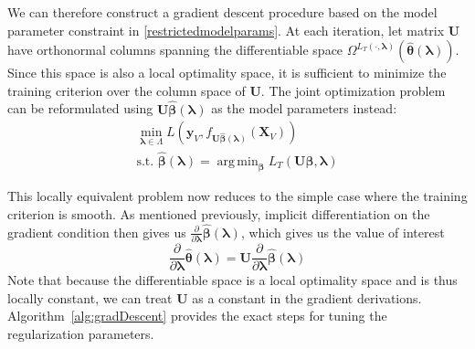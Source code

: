 \documentclass{statsoc}
\DeclareMathOperator*{\argmin}{arg\,min}
\begin{document}
We can therefore construct a gradient descent procedure based on the model parameter constraint in \eqref{restrictedmodelparams}. At each iteration, let matrix $\boldsymbol U$ have orthonormal columns spanning the differentiable space $\Omega^{L_T(\cdot, \boldsymbol{\lambda})}(\hat {\boldsymbol \theta}(\boldsymbol{\lambda}))$. Since this space is also a local optimality space, it is sufficient to minimize the training criterion over the column space of $\boldsymbol U$. The joint optimization problem can be reformulated using $\boldsymbol U \hat {\boldsymbol \beta}(\boldsymbol{\lambda})$ as the model parameters instead:
\begin{equation}
\begin{array}{c}
\min_{\boldsymbol \lambda \in \Lambda} L(\boldsymbol y_V, f_{\boldsymbol U \hat{\boldsymbol \beta} (\boldsymbol \lambda) }(\boldsymbol X_V)) \\
\text{s.t. } \hat{\boldsymbol \beta} (\boldsymbol \lambda) =
\argmin_{\boldsymbol \beta}
L_T (\boldsymbol U \boldsymbol \beta, \boldsymbol{\lambda} )
\end{array}
\end{equation}

This locally equivalent problem now reduces to the simple case where the training criterion is smooth. As mentioned previously, implicit differentiation on the gradient condition then gives us $\frac{\partial}{\partial \boldsymbol \lambda}\hat{\boldsymbol \beta}(\boldsymbol \lambda)$, which gives us the value of interest
\begin{equation}
\frac{\partial}{\partial \boldsymbol \lambda}
\hat{\boldsymbol \theta}(\boldsymbol \lambda) =
\boldsymbol U
\frac{\partial}{\partial \boldsymbol \lambda}\hat{\boldsymbol \beta}(\boldsymbol \lambda)
\end{equation}
Note that because the differentiable space is a local optimality space and is thus locally constant, we can treat $\boldsymbol U$ as a constant in the gradient derivations. Algorithm~\ref{alg:gradDescent} provides the exact steps for tuning the regularization parameters.
\end{document}
